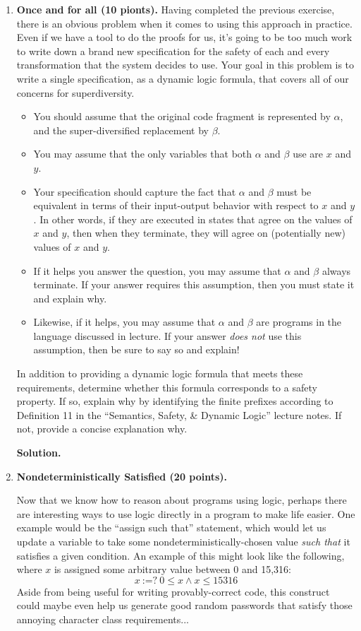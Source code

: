 \documentclass[10pt]{article}
\begin{document}
\begin{enumerate}
\item \textbf{Once and for all (10 pionts).} Having completed the previous exercise, there is an obvious problem when it comes to using this approach in practice. Even if we have a tool to do the proofs for us, it's going to be too much work to write down a brand new specification for the safety of each and every transformation that the system decides to use. Your goal in this problem is to write a single specification, as a dynamic logic formula, that covers all of our concerns for superdiversity.
\begin{itemize}
\item You should assume that the original code fragment is represented by $\alpha$, and the super-diversified replacement by $\beta$.
\item You may assume that the only variables that both $\alpha$ and $\beta$ use are $x$ and $y$.
\item Your specification should capture the fact that $\alpha$ and $\beta$ must be equivalent in terms of their input-output behavior with respect to $x$ and $y$. In other words, if they are executed in states that agree on the values of $x$ and $y$, then when they terminate, they will agree on (potentially new) values of $x$ and $y$.
\item If it helps you answer the question, you may assume that $\alpha$ and $\beta$ always terminate. If your answer requires this assumption, then you must state it and explain why.
\item Likewise, if it helps, you may assume that $\alpha$ and $\beta$ are programs in the language discussed in lecture. If your answer \emph{does not} use this assumption, then be sure to say so and explain!
\end{itemize}
In addition to providing a dynamic logic formula that meets these requirements, determine whether this formula corresponds to a safety property. If so, explain why by identifying the finite prefixes according to Definition 11 in the ``Semantics, Safety, \& Dynamic Logic'' lecture notes. If not, provide a concise explanation why.

\textbf{Solution.}


\newpage

\item \textbf{Nondeterministically Satisfied (20 points).} 

Now that we know how to reason about programs using logic, perhaps there are interesting ways to use logic directly in a program to make life easier.
One example would be the ``assign such that'' statement, which would let us update a variable to take some nondeterministically-chosen value \emph{such that} it satisfies a given condition.
An example of this might look like the following, where $x$ is assigned some arbitrary value between 0 and 15,316:
\[
x~\texttt{:=?}~0 \le x \land x \le 15316
\]
Aside from being useful for writing provably-correct code, this construct could maybe even help us generate good random passwords that satisfy those annoying character class requirements...


\end{enumerate}
\end{document}
